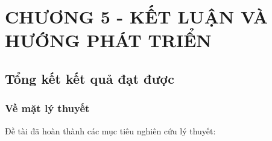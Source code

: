 
\section*{CHƯƠNG 5 - KẾT LUẬN VÀ HƯỚNG PHÁT TRIỂN}
\setcounter{section}{5}
\setcounter{subsection}{0}
\setcounter{figure}{0}
\setcounter{table}{0}

\subsection{Tổng kết kết quả đạt được}

\subsubsection{Về mặt lý thuyết}
Đề tài đã hoàn thành các mục tiêu nghiên cứu lý thuyết:

